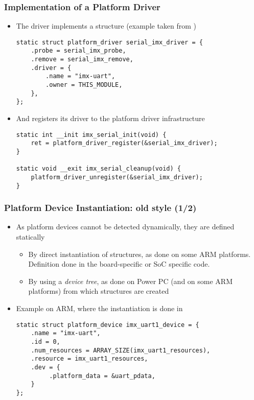 \begin{frame}[fragile]
  \frametitle{Implementation of a Platform Driver}
  \begin{itemize}
  \item The driver implements a 
    structure (example taken from )
    \begin{block}{}
    \begin{verbatim}
static struct platform_driver serial_imx_driver = {
    .probe = serial_imx_probe,
    .remove = serial_imx_remove,
    .driver = {
        .name = "imx-uart",
        .owner = THIS_MODULE,
    },
};
\end{verbatim}
\end{block}
\item And registers its driver to the platform driver infrastructure
  \begin{block}{}
  \begin{verbatim}
static int __init imx_serial_init(void) {
    ret = platform_driver_register(&serial_imx_driver);
}

static void __exit imx_serial_cleanup(void) {
    platform_driver_unregister(&serial_imx_driver);
}
  \end{verbatim}
\end{block}
\end{itemize}
\end{frame}

\begin{frame}[fragile]
  \frametitle{Platform Device Instantiation: old style (1/2)}
  \begin{itemize}
  \item As platform devices cannot be detected dynamically, they are
    defined statically
    \begin{itemize}
    \item By direct instantiation of 
      structures, as done on some ARM platforms. Definition done in
      the board-specific or SoC specific code.
    \item By using a \emph{device tree}, as done on Power PC (and on
      some ARM platforms) from which 
      structures are created
    \end{itemize}
  \item Example on ARM, where the instantiation is done in
    \begin{block}{}
\begin{verbatim}
static struct platform_device imx_uart1_device = {
    .name = "imx-uart",
    .id = 0,
    .num_resources = ARRAY_SIZE(imx_uart1_resources),
    .resource = imx_uart1_resources,
    .dev = {
         .platform_data = &uart_pdata,
    }
};
\end{verbatim}
\end{block}
\end{itemize}
\end{frame}

